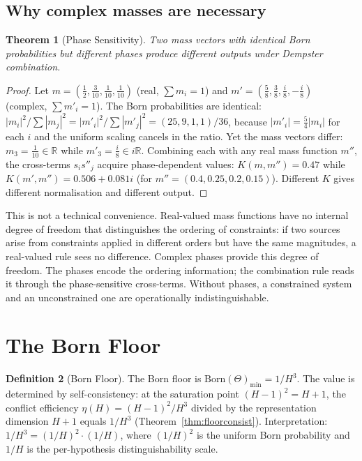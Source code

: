 \documentclass[11pt,a4paper]{article}
\newtheorem{theorem}{Theorem}[section]
\theoremstyle{definition}
\newtheorem{definition}[theorem]{Definition}
\theoremstyle{remark}
\newcommand{\R}{\mathbb{R}}
\begin{document}
\subsection{Why complex masses are necessary}

\begin{theorem}[Phase Sensitivity]\label{thm:phase}
Two mass vectors with identical Born probabilities but different phases produce different outputs under Dempster combination.
\end{theorem}

\begin{proof}
Let $m=(\tfrac{1}{2},\tfrac{3}{10},\tfrac{1}{10},\tfrac{1}{10})$ (real, $\sum m_i=1$) and $m'=(\tfrac{5}{8},\tfrac{3}{8},\tfrac{i}{8},-\tfrac{i}{8})$ (complex, $\sum m'_i=1$). The Born probabilities are identical: $|m_i|^2/\sum|m_j|^2=|m'_i|^2/\sum|m'_j|^2=(25,9,1,1)/36$, because $|m'_i|=\tfrac{5}{4}|m_i|$ for each $i$ and the uniform scaling cancels in the ratio. Yet the mass vectors differ: $m_3=\tfrac{1}{10}\in\R$ while $m'_3=\tfrac{i}{8}\in i\R$. Combining each with any real mass function $m''$, the cross-terms $s_is''_j$ acquire phase-dependent values: $K(m,m'')=0.47$ while $K(m',m'')=0.506+0.081i$ (for $m''=(0.4,0.25,0.2,0.15)$). Different $K$ gives different normalisation and different output.
\end{proof}

This is not a technical convenience. Real-valued mass functions have no internal degree of freedom that distinguishes the ordering of constraints: if two sources arise from constraints applied in different orders but have the same magnitudes, a real-valued rule sees no difference. Complex phases provide this degree of freedom. The phases encode the ordering information; the combination rule reads it through the phase-sensitive cross-terms. Without phases, a constrained system and an unconstrained one are operationally indistinguishable.


\section{The Born Floor}\label{sec:floor}

\begin{definition}[Born Floor]\label{def:bornfloor}
The Born floor is $\mathrm{Born}(\Theta)_{\min}=1/H^3$. The value is determined by self-consistency: at the saturation point $(H-1)^2=H+1$, the conflict efficiency $\eta(H)=(H-1)^2/H^3$ divided by the representation dimension $H+1$ equals $1/H^3$ (Theorem~\ref{thm:floorconsist}). Interpretation: $1/H^3=(1/H)^2\cdot(1/H)$, where $(1/H)^2$ is the uniform Born probability and $1/H$ is the per-hypothesis distinguishability scale.
\end{definition}
\end{document}
